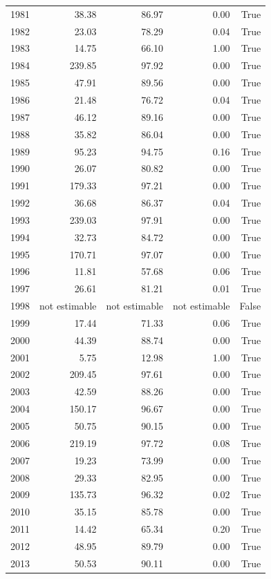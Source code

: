 \begin{longtable}{rrrrr}
1981 & 38.38 & 86.97 & 0.00 & True \\
1982 & 23.03 & 78.29 & 0.04 & True \\
1983 & 14.75 & 66.10 & 1.00 & True \\
1984 & 239.85 & 97.92 & 0.00 & True \\
1985 & 47.91 & 89.56 & 0.00 & True \\
1986 & 21.48 & 76.72 & 0.04 & True \\
1987 & 46.12 & 89.16 & 0.00 & True \\
1988 & 35.82 & 86.04 & 0.00 & True \\
1989 & 95.23 & 94.75 & 0.16 & True \\
1990 & 26.07 & 80.82 & 0.00 & True \\
1991 & 179.33 & 97.21 & 0.00 & True \\
1992 & 36.68 & 86.37 & 0.04 & True \\
1993 & 239.03 & 97.91 & 0.00 & True \\
1994 & 32.73 & 84.72 & 0.00 & True \\
1995 & 170.71 & 97.07 & 0.00 & True \\
1996 & 11.81 & 57.68 & 0.06 & True \\
1997 & 26.61 & 81.21 & 0.01 & True \\
1998 & not estimable & not estimable & not estimable & False \\
1999 & 17.44 & 71.33 & 0.06 & True \\
2000 & 44.39 & 88.74 & 0.00 & True \\
2001 & 5.75 & 12.98 & 1.00 & True \\
2002 & 209.45 & 97.61 & 0.00 & True \\
2003 & 42.59 & 88.26 & 0.00 & True \\
2004 & 150.17 & 96.67 & 0.00 & True \\
2005 & 50.75 & 90.15 & 0.00 & True \\
2006 & 219.19 & 97.72 & 0.08 & True \\
2007 & 19.23 & 73.99 & 0.00 & True \\
2008 & 29.33 & 82.95 & 0.00 & True \\
2009 & 135.73 & 96.32 & 0.02 & True \\
2010 & 35.15 & 85.78 & 0.00 & True \\
2011 & 14.42 & 65.34 & 0.20 & True \\
2012 & 48.95 & 89.79 & 0.00 & True \\
2013 & 50.53 & 90.11 & 0.00 & True \\

\end{longtable}
